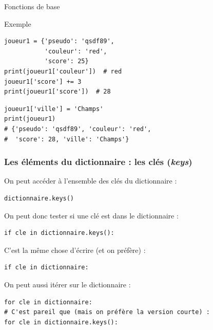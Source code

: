 \documentclass[x11names,svgnames]{beamer}
\begin{document}
\begin{frame}[fragile]{Fonctions de base}
  \begin{exampleblock}{Exemple}
  \begin{mdframed}[roundcorner=5pt]
\begin{verbatim}
joueur1 = {'pseudo': 'qsdf89',
           'couleur': 'red',
           'score': 25}
print(joueur1['couleur'])  # red
joueur1['score'] += 3
print(joueur1['score'])  # 28
\end{verbatim}
    \end{mdframed}
\pause
  \begin{mdframed}[roundcorner=5pt]
\begin{verbatim}
joueur1['ville'] = 'Champs'
print(joueur1)
# {'pseudo': 'qsdf89', 'couleur': 'red',
#  'score': 28, 'ville': 'Champs'}
\end{verbatim}
    \end{mdframed}
\end{exampleblock}
\end{frame}

\begin{frame}[fragile]
  \frametitle{Les éléments du dictionnaire : les clés (\emph{keys})}

    On peut accéder à l'ensemble des clés du dictionnaire :
  \begin{mdframed}[roundcorner=5pt]
\begin{verbatim}
dictionnaire.keys()
\end{verbatim}
  \end{mdframed}
    On peut donc tester si une clé est dans le dictionnaire :
  \begin{mdframed}[roundcorner=5pt]
\begin{verbatim}
if cle in dictionnaire.keys():
\end{verbatim}
  \end{mdframed}
  C'est la même chose d'écrire (et on préfère) :
  \begin{mdframed}[roundcorner=5pt]
\begin{verbatim}
if cle in dictionnaire:
\end{verbatim}
  \end{mdframed}
  On peut aussi \alert{itérer} sur le dictionnaire :
  \begin{mdframed}[roundcorner=5pt]
\begin{verbatim}
for cle in dictionnaire:
# C'est pareil que (mais on préfère la version courte) :
for cle in dictionnaire.keys():
\end{verbatim}
  \end{mdframed}
  \end{frame}
\end{document}

